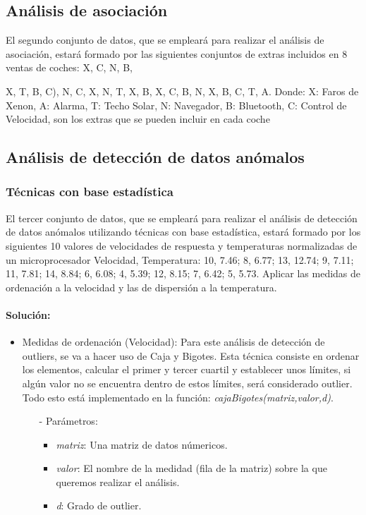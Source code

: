 \documentclass[a4paper, 12pt]{article}
\begin{document}
    \subsection{Análisis de asociación}
        El segundo conjunto de datos, que se empleará para realizar el análisis de asociación, estará formado por las siguientes conjuntos de extras incluidos en 8 ventas de coches: {X, C, N, B}, {X, T, B, C), {N, C, X}, {N, T, X, B}, {X, C, B}, {N}, {X, B, C}, {T, A}. Donde: {X: Faros de Xenon, A: Alarma, T: Techo Solar, N: Navegador, B: Bluetooth, C: Control de Velocidad}, son los extras que se pueden incluir en cada coche
    		
        \subsection{Análisis de detección de datos anómalos}
        
            \subsubsection{Técnicas con base estadística}
            El tercer conjunto de datos, que se empleará para realizar el análisis de detección de datos anómalos utilizando técnicas con base estadística, estará formado por los siguientes 10 valores de velocidades de respuesta y temperaturas normalizadas de un microprocesador {Velocidad, Temperatura}: {10, 7.46; 8, 6.77; 13, 12.74; 9, 7.11; 11, 7.81; 14, 8.84; 6, 6.08; 4, 5.39; 12, 8.15; 7, 6.42; 5, 5.73}. Aplicar las medidas de ordenación a la velocidad y las de dispersión a la temperatura.

            \paragraph{Solución:}
            \begin{itemize}
                \item Medidas de ordenación (Velocidad): Para este análisis de detección de outliers, se va a hacer uso de Caja y Bigotes. Esta técnica consiste en ordenar los elementos, calcular el primer y tercer cuartil y establecer unos límites, si algún valor no se encuentra dentro de estos límites, será considerado outlier. \\ Todo esto está implementado en la función: \emph{cajaBigotes(matriz,valor,d)}.
                \begin{itemize}
                    \item[-] Parámetros:
                    \begin{itemize}
                        \item \emph{matriz}: Una matriz de datos númericos.
                        \item \emph{valor}: El nombre de la medidad (fila de la matriz) sobre la que queremos realizar el análisis.
                        \item \emph{d}: Grado de outlier.
                    \end{itemize}


\end{itemize}
\end{itemize}}
\end{document}
